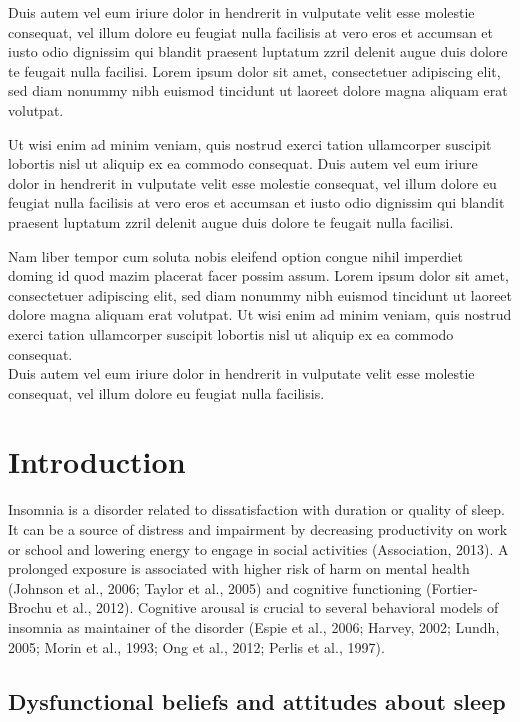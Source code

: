 \documentclass[
  ,doc,11pt, twoside,floatsintext]{apa6}
\begin{document}
Duis autem vel eum iriure dolor in hendrerit in vulputate velit esse molestie consequat, vel illum dolore eu feugiat nulla facilisis at vero eros et accumsan et iusto odio dignissim qui blandit praesent luptatum zzril delenit augue duis dolore te feugait nulla facilisi. Lorem ipsum dolor sit amet, consectetuer adipiscing elit, sed diam nonummy nibh euismod tincidunt ut laoreet dolore magna aliquam erat volutpat.

Ut wisi enim ad minim veniam, quis nostrud exerci tation ullamcorper suscipit lobortis nisl ut aliquip ex ea commodo consequat. Duis autem vel eum iriure dolor in hendrerit in vulputate velit esse molestie consequat, vel illum dolore eu feugiat nulla facilisis at vero eros et accumsan et iusto odio dignissim qui blandit praesent luptatum zzril delenit augue duis dolore te feugait nulla facilisi.

Nam liber tempor cum soluta nobis eleifend option congue nihil imperdiet doming id quod mazim placerat facer possim assum. Lorem ipsum dolor sit amet, consectetuer adipiscing elit, sed diam nonummy nibh euismod tincidunt ut laoreet dolore magna aliquam erat volutpat. Ut wisi enim ad minim veniam, quis nostrud exerci tation ullamcorper suscipit lobortis nisl ut aliquip ex ea commodo consequat.\\
Duis autem vel eum iriure dolor in hendrerit in vulputate velit esse molestie consequat, vel illum dolore eu feugiat nulla facilisis.

\hypertarget{introduction}{%
\section{Introduction}\label{introduction}}

Insomnia is a disorder related to dissatisfaction with duration or quality of sleep. It can be a source of distress and impairment by decreasing productivity on work or school and lowering energy to engage in social activities (Association, 2013). A prolonged exposure is associated with higher risk of harm on mental health (Johnson et al., 2006; Taylor et al., 2005) and cognitive functioning (Fortier-Brochu et al., 2012). Cognitive arousal is crucial to several behavioral models of insomnia as maintainer of the disorder (Espie et al., 2006; Harvey, 2002; Lundh, 2005; Morin et al., 1993; Ong et al., 2012; Perlis et al., 1997).

\hypertarget{dysfunctional-beliefs-and-attitudes-about-sleep}{%
\subsection{Dysfunctional beliefs and attitudes about sleep}\label{dysfunctional-beliefs-and-attitudes-about-sleep}}
\end{document}
